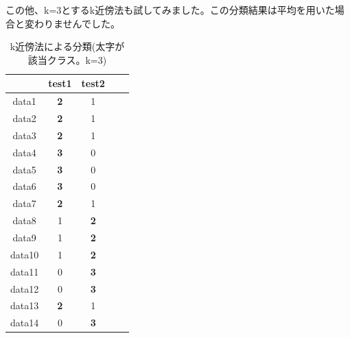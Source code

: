 この他、k=3とするk近傍法も試してみました。この分類結果は平均を用いた場合と変わりませんでした。
\begin{table}[htb]
\centering
\caption{k近傍法による分類(太字が該当クラス。k=3)}
\begin{tabular}{|c|c|c|c|c|} \hline
 & test1 & test2 \\ \hline \hline
data1 & \textbf{2} & 1 \\ \hline
data2 & \textbf{2} & 1 \\ \hline
data3 & \textbf{2} & 1 \\ \hline
data4 & \textbf{3} & 0 \\ \hline
data5 & \textbf{3} & 0 \\ \hline
data6 & \textbf{3} & 0 \\ \hline
data7 & \textbf{2} & 1 \\ \hline
data8 & 1 & \textbf{2} \\ \hline
data9 & 1 & \textbf{2} \\ \hline
data10 & 1 & \textbf{2} \\ \hline
data11 & 0 & \textbf{3} \\ \hline
data12 & 0 & \textbf{3} \\ \hline
data13 & \textbf{2} & 1 \\ \hline
data14 & 0 & \textbf{3} \\ \hline
\end{tabular}
\end{table}
	

